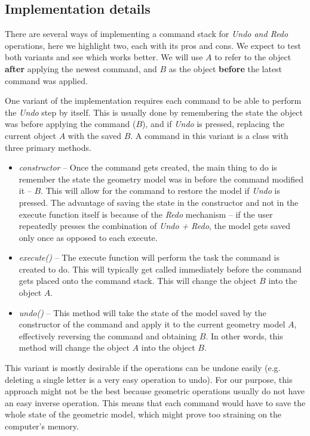 \subsection*{Implementation details}

There are several ways of implementing a command stack for \textit{Undo and Redo} operations, here we highlight two, each with its pros and cons. We expect to test both variants and see which works better. We will use $A$ to refer to the object \textbf{after} applying the newest command, and $B$ as the object \textbf{before} the latest command was applied.

One variant of the implementation requires each command to be able to perform the \textit{Undo} step by itself. This is usually done by remembering the state the object was before applying the command ($B$), and if \textit{Undo} is pressed, replacing the current object $A$ with the saved $B$. A command in this variant is a class with three primary methods.
\begin{itemize}
\item \textit{constructor} -- Once the command gets created, the main thing to do is remember the state the geometry model was in before the command modified it -- $B$. This will allow for the command to restore the model if \textit{Undo} is pressed. The advantage of saving the state in the constructor and not in the execute function itself is because of the \textit{Redo} mechanism -- if the user repeatedly presses the combination of \textit{Undo + Redo}, the model gets saved only once as opposed to each execute.
\item \textit{execute()} -- The execute function will perform the task the command is created to do. This will typically get called immediately before the command gets placed onto the command stack. This will change the object $B$ into the object $A$.
\item \textit{undo()} -- This method will take the state of the model saved by the constructor of the command and apply it to the current geometry model $A$, effectively reversing the command and obtaining $B$. In other words, this method will change the object $A$ into the object $B$.
\end{itemize}

This variant is mostly desirable if the operations can be undone easily (e.g. deleting a single letter is a very easy operation to undo). For our purpose, this approach might not be the best because geometric operations usually do not have an easy inverse operation. This means that each command would have to save the whole state of the geometric model, which might prove too straining on the computer's memory.

